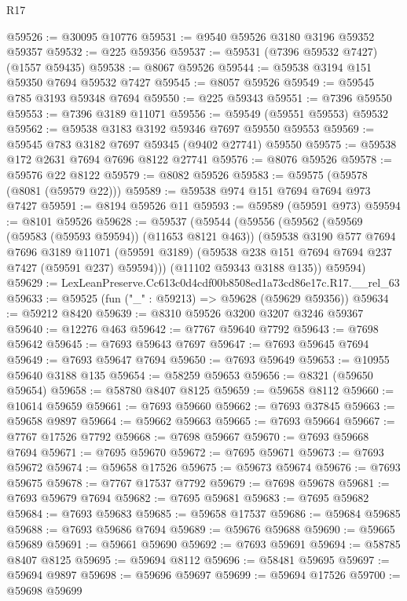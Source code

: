\begin{lexlean}{R17}
\begin{coremodule}
@59526 := @30095 @10776
@59531 := @9540 @59526 @3180 @3196 @59352 @59357
@59532 := @225 @59356
@59537 := @59531 (@7396 @59532 @7427) (@1557 @59435)
@59538 := @8067 @59526
@59544 := @59538 @3194 @151 @59350 @7694 @59532 @7427
@59545 := @8057 @59526
@59549 := @59545 @785 @3193 @59348 @7694
@59550 := @225 @59343
@59551 := @7396 @59550
@59553 := @7396 @3189 @11071
@59556 := @59549 (@59551 @59553) @59532
@59562 := @59538 @3183 @3192 @59346 @7697 @59550 @59553
@59569 := @59545 @783 @3182 @7697 @59345 (@9402 @27741) @59550
@59575 := @59538 @172 @2631 @7694 @7696 @8122 @27741
@59576 := @8076 @59526
@59578 := @59576 @22 @8122
@59579 := @8082 @59526
@59583 := @59575 (@59578 (@8081 (@59579 @22)))
@59589 := @59538 @974 @151 @7694 @7694 @973 @7427
@59591 := @8194 @59526 @11
@59593 := @59589 (@59591 @973)
@59594 := @8101 @59526
@59628 := @59537
    (@59544
      (@59556
        (@59562
          (@59569 (@59583 (@59593 @59594)) (@11653 @8121 @463))
          (@59538
            @3190
            @577
            @7694
            @7696
            @3189
            @11071
            (@59591 @3189)
            (@59538 @238 @151 @7694 @7694 @237 @7427 (@59591 @237) @59594)))
        (@11102 @59343 @3188 @135))
      @59594)
@59629 := LexLeanPreserve.Cc613c0d4cdf00b8508ed1a73cd86e17c.R17.__rel_63
@59633 := @59525 (fun ("_" : @59213) => @59628 (@59629 @59356))
@59634 := @59212 @8420
@59639 := @8310 @59526 @3200 @3207 @3246 @59367
@59640 := @12276 @463
@59642 := @7767 @59640 @7792
@59643 := @7698 @59642
@59645 := @7693 @59643 @7697
@59647 := @7693 @59645 @7694
@59649 := @7693 @59647 @7694
@59650 := @7693 @59649
@59653 := @10955 @59640 @3188 @135
@59654 := @58259 @59653
@59656 := @8321 (@59650 @59654)
@59658 := @58780 @8407 @8125
@59659 := @59658 @8112
@59660 := @10614 @59659
@59661 := @7693 @59660
@59662 := @7693 @37845
@59663 := @59658 @9897
@59664 := @59662 @59663
@59665 := @7693 @59664
@59667 := @7767 @17526 @7792
@59668 := @7698 @59667
@59670 := @7693 @59668 @7694
@59671 := @7695 @59670
@59672 := @7695 @59671
@59673 := @7693 @59672
@59674 := @59658 @17526
@59675 := @59673 @59674
@59676 := @7693 @59675
@59678 := @7767 @17537 @7792
@59679 := @7698 @59678
@59681 := @7693 @59679 @7694
@59682 := @7695 @59681
@59683 := @7695 @59682
@59684 := @7693 @59683
@59685 := @59658 @17537
@59686 := @59684 @59685
@59688 := @7693 @59686 @7694
@59689 := @59676 @59688
@59690 := @59665 @59689
@59691 := @59661 @59690
@59692 := @7693 @59691
@59694 := @58785 @8407 @8125
@59695 := @59694 @8112
@59696 := @58481 @59695
@59697 := @59694 @9897
@59698 := @59696 @59697
@59699 := @59694 @17526
@59700 := @59698 @59699

\end{coremodule}
\end{lexlean}
